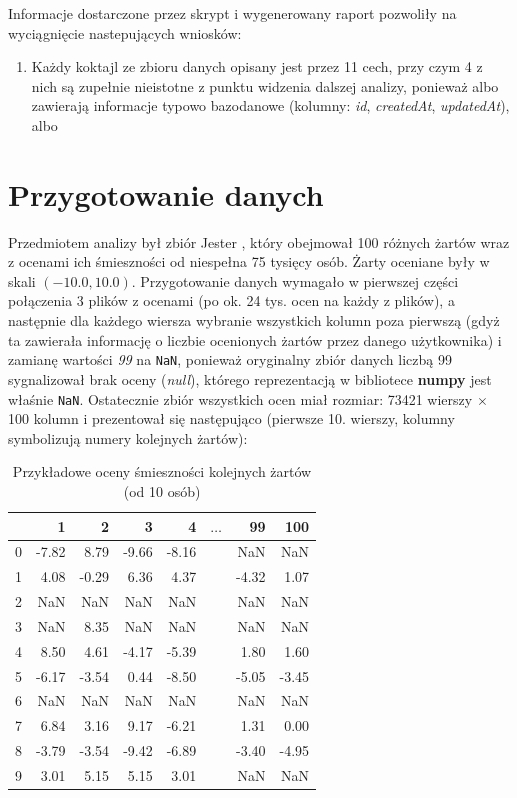\documentclass{article}
\newcommand{\code}[1]{\colorbox{light-gray}{\texttt{#1}}}
\begin{document}
    Informacje dostarczone przez skrypt i wygenerowany raport pozwoliły na wyciągnięcie nastepujących wniosków:
    \begin{enumerate}
        \item Każdy koktajl ze zbioru danych opisany jest przez 11 cech, przy czym 4 z nich są zupełnie nieistotne z punktu widzenia dalszej analizy, ponieważ albo zawierają informacje typowo bazodanowe (kolumny: \textit{id}, \textit{createdAt}, \textit{updatedAt}), albo 
    \end{enumerate}


\section{Przygotowanie danych}
Przedmiotem analizy był zbiór Jester \cite{Jester}, który obejmował 100 różnych żartów wraz z ocenami ich śmieszności od niespełna 75 tysięcy osób. Żarty oceniane były w skali $(-10.0, 10.0)$. Przygotowanie danych wymagało w pierwszej części połączenia 3 plików z ocenami (po ok. 24 tys. ocen na każdy z plików), a następnie dla każdego wiersza wybranie wszystkich kolumn poza pierwszą (gdyż ta zawierała informację o liczbie ocenionych żartów przez danego użytkownika) i zamianę wartości \textit{99} na \code{NaN}, ponieważ oryginalny zbiór danych liczbą 99 sygnalizował brak oceny (\textit{null}), którego reprezentacją w bibliotece \textbf{numpy} jest właśnie \code{NaN}. Ostatecznie zbiór wszystkich ocen miał rozmiar: 73421 wierszy $\times$ 100 kolumn i prezentował się następująco (pierwsze 10. wierszy, kolumny symbolizują numery kolejnych żartów):

    \begin{table}[!htbp]%
        \centering
        \begin{tabular}{l|rrrrcrr}
             & 1 & 2 & 3 & 4 & $\dots$ & 99 & 100 \\ \hline
            0 & -7.82 & 8.79 & -9.66 & -8.16 & & NaN & NaN \\
            1 & 4.08 & -0.29 & 6.36 & 4.37 & & -4.32 & 1.07 \\
            2 & NaN & NaN & NaN & NaN & & NaN & NaN \\
            3 & NaN & 8.35 & NaN & NaN & & NaN & NaN \\
            4 & 8.50 & 4.61 & -4.17 & -5.39 & & 1.80 & 1.60 \\
            5 & -6.17 & -3.54 & 0.44 & -8.50 & & -5.05 & -3.45 \\
            6 & NaN & NaN & NaN & NaN & & NaN & NaN \\
            7 & 6.84 & 3.16 & 9.17 & -6.21 & & 1.31 & 0.00 \\
            8 & -3.79 & -3.54 & -9.42 & -6.89 & & -3.40 & -4.95 \\
            9 & 3.01 & 5.15 & 5.15 & 3.01 & & NaN & NaN \\
        \end{tabular}
        \caption{Przykładowe oceny śmieszności kolejnych żartów (od 10 osób)}
        \label{tab:example_ratings}
    \end{table}
\end{document}

